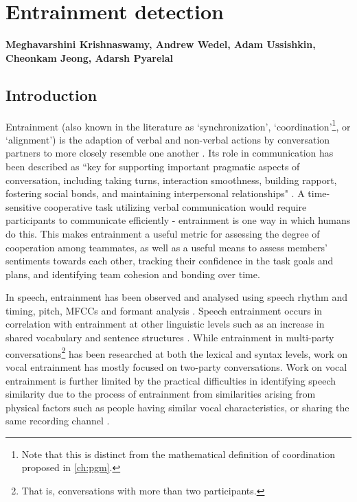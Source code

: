 \chapter{Entrainment detection}
\label{ch:entrainment}

\textbf{Meghavarshini Krishnaswamy, Andrew Wedel, Adam Ussishkin, Cheonkam
Jeong, Adarsh Pyarelal}

\section{Introduction}

Entrainment (also known in the literature as `synchronization',
`coordination'\footnote{Note that this is distinct from the mathematical
definition of coordination proposed in \autoref{ch:pgm}.}, or `alignment') is
the adaption of verbal and non-verbal actions by conversation partners to more
closely resemble one another \citep{borrie2014}. Its role in communication has
been described as ``key for supporting important pragmatic aspects of
conversation, including taking turns, interaction smoothness, building rapport,
fostering social bonds, and maintaining interpersonal relationships"
\citep{borrie2019}.  A time-sensitive cooperative task utilizing verbal
communication would require participants to communicate efficiently -
entrainment is one way in which humans do this. This makes entrainment a useful
metric for assessing the degree of cooperation among teammates, as well as a
useful means to assess members' sentiments towards each other, tracking their
confidence in the task goals and plans, and identifying team cohesion and
bonding over time.

In speech, entrainment has been observed and analysed using speech rhythm and
timing, pitch, MFCCs and formant analysis
\citep{reichel2018prosodic,borrie2019syncing}. Speech entrainment occurs in
correlation with entrainment at other linguistic levels such as an increase in
shared vocabulary and sentence structures \citep{rahimi2017entrainment}.  While
entrainment in multi-party conversations\footnote{That is, conversations with
more than two participants.} has been researched at both the lexical and syntax
levels, work on vocal entrainment has mostly focused on two-party
conversations. Work on vocal entrainment is further limited by the practical
difficulties in identifying speech similarity due to the process of entrainment
from similarities arising from physical factors such as people having similar
vocal characteristics, or sharing the same recording channel \citep{nasir2020}.

